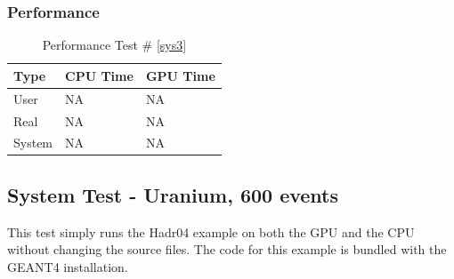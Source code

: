 \documentclass[12pt]{article}
\begin{document}
	\subsubsection{Performance}
		\begin{table}[!htbp]
		\centering
		\caption{Performance Test \# \ref{sys3}}\label{_acc}
		\begin{tabular}{lll}
		\toprule
		Type&CPU Time& GPU Time\\\midrule
		User&NA&NA\\
		Real&NA&NA\\
		System&NA&NA\\
		\end{tabular}
		\end{table}
		
\subsection{System Test - Uranium, 600 events}
This test simply runs the Hadr04 example on both the GPU and the CPU without changing the source files. The code for this example is bundled with the GEANT4 installation.\\
\break
\end{document}
